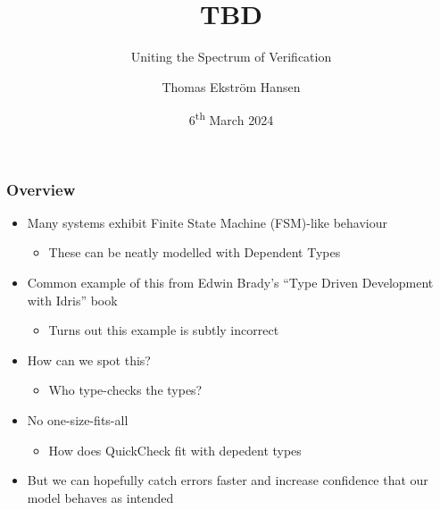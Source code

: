 \documentclass[compress,handout]{beamer}
\title{TBD}
\subtitle{Uniting the Spectrum of Verification}
\author{Thomas Ekstr{\" o}m Hansen}
\date{6\textsuperscript{th} March 2024}
\begin{document}
\maketitle


\begin{frame}
  \frametitle{Overview}

  \begin{itemize}
    \item<1-> Many systems exhibit Finite State Machine (FSM)-like behaviour
    \begin{itemize}
      \item<1-> These can be neatly modelled with Dependent Types
    \end{itemize}
    \item<2-> Common example of this from Edwin Brady's ``Type Driven
              Development with Idris'' book
    \begin{itemize}
      \item<2-> Turns out this example is subtly incorrect
    \end{itemize}
    \item<3-> How can we spot this?
    \begin{itemize}
      \item<3-> Who type-checks the types?
    \end{itemize}
    \item<4-> No one-size-fits-all
    \begin{itemize}
      \item<4-> How does QuickCheck fit with depedent types
    \end{itemize}
    \item<5-> But we can hopefully catch errors faster and increase confidence
              that our model behaves as intended
  \end{itemize}

\end{frame}
\end{document}
